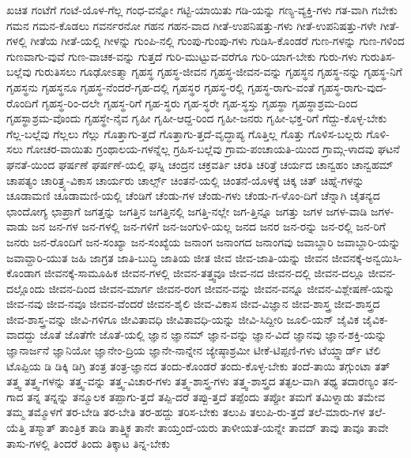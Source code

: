 {ಖಚಿತ
ಗಂಟೆಗೆ
ಗಂಟೆ-ಯೊಳ-ಗೆಲ್ಲ
ಗಂಧ-ವನ್ನೋ
ಗಟ್ಟಿ-ಯಾಯಿತು
ಗಡಿ-ಯನ್ನು
ಗಣ್ಯ-ವ್ಯಕ್ತಿ-ಗಳು
ಗತ-ವಾಗಿ
ಗಬೇಕು
ಗಮನ
ಗಮನ-ಕೊಡಲು
ಗವರ್ನರನೋ
ಗಹನ
ಗಹನ-ವಾದ
ಗೀತೆ-ಉಪನಿಷತ್ತು-ಗಳು
ಗೀತೆ-ಉಪನಿಷತ್ತು-ಗಳೇ
ಗೀತೆ-ಗಳಲ್ಲಿ
ಗೀತೆಯ
ಗೀತೆ-ಯಲ್ಲಿ
ಗೀಳನ್ನು
ಗುಂಪಿ-ನಲ್ಲಿ
ಗುಂಪು-ಗುಂಪು-ಗಳು
ಗುಡಿಸಿ-ಕೊಂಡರೆ
ಗುಣ-ಗಳನ್ನು
ಗುಣ-ಗಳಿಂದ
ಗುಣವಾಗು-ವುವೆ
ಗುಣ-ವಾಚಕ-ವನ್ನು
ಗುತ್ತದೆ
ಗುರಿ-ಮುಟ್ಟುವ-ವರೆಗೂ
ಗುರಿ-ಯಾಗ-ಬೇಕು
ಗುರು-ಗಳು
ಗುರುತಿಸ-ಬಲ್ಲೆವು
ಗುರುತಿಸಲು
ಗೂಢೋಽತ್ಮಾ
ಗೃಹಸ್ಥ
ಗೃಹಸ್ಥ-ಜೀವನ
ಗೃಹಸ್ಥ-ಜೀವನ-ವನ್ನು
ಗೃಹಸ್ಥನ
ಗೃಹಸ್ಥ-ನನ್ನು
ಗೃಹಸ್ಥ-ನಿಗೆ
ಗೃಹಸ್ಥನು
ಗೃಹಸ್ಥನೂ
ಗೃಹಸ್ಥ-ನೆಂದರೆ-ಗೃಹ-ದಲ್ಲಿ
ಗೃಹಸ್ಥರ
ಗೃಹಸ್ಥ-ರಲ್ಲಿ
ಗೃಹಸ್ಥ-ರಾಗು-ವಂತೆ
ಗೃಹಸ್ಥ-ರಾಗು-ವುದ-ರೊಂದಿಗೆ
ಗೃಹಸ್ಥ-ರಿಂ-ದಲೇ
ಗೃಹಸ್ಥ-ರಿಗೆ
ಗೃಹ-ಸ್ಥರು
ಗೃಹ-ಸ್ಥರೇ
ಗೃಹ-ಸ್ಥಸ್ತು
ಗೃಹಸ್ಥಾ
ಗೃಹಸ್ಥಾಶ್ರಮ-ದಿಂದ
ಗೃಹಸ್ಥಾಶ್ರಮ-ವೊಂದು
ಗೃಹಸ್ಥೇ-ನೈವ
ಗೃಹೀ
ಗೃಹೀ-ಆದ್ದ-ರಿಂದ
ಗೃಹೀ-ಜನರು
ಗೃಹೀ-ಭಕ್ತ-ರಿಗೆ
ಗೆದ್ದು-ಕೊಳ್ಳ-ಬೇಕು
ಗೆಲ್ಲ-ಬಲ್ಲೆವು
ಗೆಲ್ಲಲು
ಗೆಲ್ಲು
ಗೊತ್ತಾಗು-ತ್ತದೆ
ಗೊತ್ತಾಗು-ತ್ತದೆ-ವೃದ್ಧಾಪ್ಯ
ಗೊತ್ತಿಲ್ಲ
ಗೊತ್ತು
ಗೊಳಿಸ-ಬಲ್ಲರು
ಗೊಳಿ-ಸಲು
ಗೋಚರ-ವಾಯಿತು
ಗ್ರಂಥಾಲಯ-ಗಳನ್ನೆಲ್ಲ
ಗ್ರಹಿಸ-ಬಲ್ಲೆವು
ಗ್ರಾಮ-ಪಂಚಾಯತಿ-ಯಿಂದ
ಗ್ರಾಮ್ಗ-ಳಾದವು
ಘಟನೆ
ಘನತೆ-ಯಿಂದ
ಘರ್ಷಣೆ
ಘರ್ಷಣೆ-ಯಲ್ಲಿ
ಘಸ್ನಿ
ಚಂದ್ರನ
ಚಕ್ರವರ್ತಿ
ಚರತಿ
ಚರಿತ್ರೆ
ಚರ್ಯದ
ಚಾನ್ವಹಂ
ಚಾನ್ವಹಮ್
ಚಾಪತ್ಯಂ
ಚಾರಿತ್ರ್ಯ-ವಿಕಾಸ
ಚಾರ್ಯರು
ಚಾರ್ಲ್ಸ್
ಚಿಂತನೆ-ಯಲ್ಲಿ
ಚಿಂತನೆ-ಯೊಳಕ್ಕೆ
ಚಿಕ್ಕ
ಚಿತ್
ಚಿಹ್ನೆ-ಗಳನ್ನು
ಚೂಡಾಮಣಿ
ಚೂಡಾಮಣಿ-ಯಲ್ಲಿ
ಚೆಂಡಿಗೆ
ಚೆಂಡು-ಗಳ
ಚೆಂಡು-ಗಳು
ಚೆಂಡು-ಗ-ಳೊಂ-ದಿಗೆ
ಚೆನ್ನಾಗಿ
ಚೈತನ್ಯದ
ಛಾಂದೋಗ್ಯ
ಛಾಪ್ರಾಗೆ
ಜಗತ್ತನ್ನು
ಜಗತ್ತಿನ
ಜಗತ್ತಿನಲ್ಲಿ
ಜಗತ್ತಿ-ನಲ್ಲೇ
ಜಗ-ತ್ತಿನ್ನೂ
ಜಗತ್ತು
ಜಗಳ
ಜಗಳ-ವಾಡಿ
ಜಗಳ-ವಾಡು
ಜನ
ಜನ-ಗಳ
ಜನ-ಗಳಲ್ಲಿ
ಜನ-ಗಳಿಗೆ
ಜನ-ಜಂಗುಳಿ-ಯಲ್ಲ
ಜನದ
ಜನರ
ಜನ-ರನ್ನು
ಜನ-ರಲ್ಲಿ
ಜನ-ರಿಗೆ
ಜನರು
ಜನ-ರೊಂದಿಗೆ
ಜನ-ಸಂಖ್ಯಾ
ಜನ-ಸಂಖ್ಯೆಯ
ಜನಾಂಗ
ಜನಾಂಗದ
ಜನಾಂಗವು
ಜವಾಬ್ದಾರಿ
ಜವಾಬ್ದಾರಿ-ಯನ್ನು
ಜವಾವ್ದಾರಿ-ಯುತ
ಜಹಿ
ಜಾಗ್ರತ
ಜಾತಿ-ಬುದ್ಧಿ
ಜಾತಿಯ
ಜೀತ
ಜೀವ
ಜೀವ-ಜಾತಿ-ಯನ್ನು
ಜೀವನ
ಜೀವನಕ್ಕೆ-ಅನ್ವಯಿಸಿ-ಕೊಂಡಾಗ
ಜೀವನಕ್ಕೆ-ಸಾಮೂಹಿಕ
ಜೀವನ-ಗಳಲ್ಲಿ
ಜೀವನ-ತತ್ತ್ವವೂ
ಜೀವ-ನದ
ಜೀವನ-ದಲ್ಲಿ
ಜೀವನ-ದಲ್ಲೂ
ಜೀವನ-ದಲ್ಲೊಂದು
ಜೀವನ-ದಿಂದ
ಜೀವನ-ಮಾರ್ಗ
ಜೀವನ-ರಂಗ
ಜೀವನ-ವನ್ನು
ಜೀವನ-ವನ್ನೂ
ಜೀವನ-ವಿಶ್ಲೇಷಣೆ-ಯನ್ನು
ಜೀವ-ನವು
ಜೀವ-ನವೂ
ಜೀವನ-ವೆಂದರೆ
ಜೀವನ-ಶೈಲಿ
ಜೀವ-ವಿಕಾಸ
ಜೀವ-ವಿಜ್ಞಾನ
ಜೀವ-ಶಾಸ್ತ್ರ
ಜೀವ-ಶಾಸ್ತ್ರದ
ಜೀವ-ಶಾಸ್ತ್ರ-ವನ್ನು
ಜೀವಿ-ಗಳಿಗೂ
ಜೀವಿತಾವಧಿ
ಜೀವಿತಾವಧಿ-ಯನ್ನು
ಜೀವಿ-ಸಿದ್ದೀರಿ
ಜೂಲಿ-ಯನ್
ಜೈವಿಕ
ಜೈವಿಕ-ವಾದದ್ದು
ಜೊತೆ
ಜೊತೆಗೇ
ಜೊತೆ-ಯಲ್ಲಿ
ಜ್ಞಾನ
ಜ್ಞಾನಮ್
ಜ್ಞಾನ-ವನ್ನು
ಜ್ಞಾನ-ವಿದೆ
ಜ್ಞಾನವು
ಜ್ಞಾನ-ಶಕ್ತಿ-ಯನ್ನು
ಜ್ಞಾನಾರ್ಜನೆ
ಜ್ಞಾನಿಯೋ
ಜ್ಞಾನೇಂ-ದ್ರಿಯ
ಜ್ಞಾನೇ-ನಾನ್ನೇನ
ಜ್ಯೇಷ್ಠಾಶ್ರಮೀ
ಟೀಕೆ-ಟಿಪ್ಪಣಿ-ಗಳು
ಟೆಯ್ಲ್ಹಾರ್ಡ್
ಟೆಲಿ
ಟೊಪ್ಪಿಯ
ಡಿ
ಡಿಕ್ಕಿ
ಡಿಗ್ರಿ
ತಂತ್ರ
ತಂತ್ರ-ಜ್ಞಾನದ
ತಂದು-ಕೊಂಡರೆ
ತಂದು-ಕೊಳ್ಳ-ಬೇಕು
ತಂದೆ-ತಾಯಿ
ತಗ್ಗುಂಟಾ
ತತ್
ತತ್ತ್ವ
ತತ್ತ್ವ-ಗಳನ್ನು
ತತ್ತ್ವ-ವನ್ನು
ತತ್ತ್ವ-ವಿಚಾರ-ಗಳು
ತತ್ತ್ವ-ಶಾಸ್ತ್ರ-ಗಳು
ತತ್ತ್ವ-ಶಾಸ್ತ್ರದ
ತತ್ಫಲ-ವಾಗಿ
ತಥ್ಯ
ತದಾರಣ್ಯಂ
ತನ-ಗಾದ
ತನ್ನ
ತನ್ನನ್ನು
ತನ್ಮೂಲಕ
ತಪ್ಪಾಗು-ತ್ತದೆ
ತಪ್ಪಿ-ದರೆ
ತಪ್ಪು-ತ್ತದೆ
ತಪ್ಪೆಂದು
ತಪ್ಪೋ
ತಮಗೆ
ತಮಿಳ್ನಾಡು
ತಮೇವ
ತಮ್ಮ
ತಮ್ಮೊಳಗೆ
ತರ-ಬೇಡಿ
ತರ-ಬೇತಿ
ತರ-ಹದ್ದು
ತರಿಸ-ಬೇಕು
ತಲುಪಿ
ತಲುಪಿ-ರು-ತ್ತದೆ
ತಲೆ-ಮಾರು-ಗಳ
ತಲೆ-ಯೆತ್ತಿ
ತಸ್ಮಾತ್
ತಾಂತ್ರಿಕ
ತಾಡಿ
ತಾತ್ತ್ವಿಕ
ತಾನೇ
ತಾಯ್ತಂದೆ-ಯರು
ತಾಳೀಯತೆ-ಯನ್ನೇ
ತಾವದ್
ತಾವು
ತಾವೂ
ತಾವೇ
ತಾಸು-ಗಳಲ್ಲಿ
ತಿಂದರೆ
ತಿಂದು
ತಿಕ್ಕಾಟ
ತಿನ್ನ-ಬೇಕು
}
